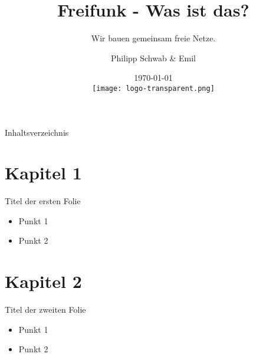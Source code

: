 \documentclass{beamer}
\begin{document}
\title[Freifunk]{Freifunk - Was ist das?}
\subtitle[Offene Netze]{Wir bauen gemeinsam freie Netze.}
\author{Philipp Schwab \& Emil}
\date{\today\\\vspace{0.5cm} \texttt{[image: logo-transparent.png]}}

\begin{frame}
\titlepage	
\end{frame}
\begin{frame}{Inhaltsverzeichnis}
	\tableofcontents
\end{frame}
\section{Kapitel 1}
\begin{frame}{Titel der ersten Folie}
\begin{itemize}
	\item Punkt 1
	\item Punkt 2
\end{itemize}
\end{frame}
\section{Kapitel 2}
\begin{frame}{Titel der zweiten Folie}
	\begin{itemize}
		\item Punkt 1
		\item Punkt 2
	\end{itemize}
\end{frame}
\end{document}
